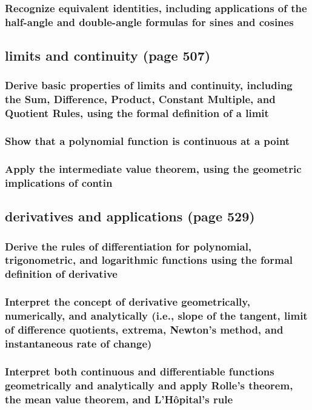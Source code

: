 \documentclass[11pt]{article}
\begin{document}
\subsubsection{Recognize equivalent identities, including applications of the half-angle and double-angle formulas for sines and cosines}
\label{sec:orgeac3892}
\subsection{limits and continuity (page 507)}
\label{sec:org4f4016c}
\subsubsection{Derive basic properties of limits and continuity, including the Sum, Difference, Product, Constant Multiple, and Quotient Rules, using the formal definition of a limit}
\label{sec:orgb6f1019}
\subsubsection{Show that a polynomial function is continuous at a point}
\label{sec:org3ec723d}
\subsubsection{Apply the intermediate value theorem, using the geometric implications of contin}
\label{sec:org4fb7324}
\subsection{derivatives and applications (page 529)}
\label{sec:org29a166e}
\subsubsection{Derive the rules of differentiation for polynomial, trigonometric, and logarithmic functions using the formal definition of derivative}
\label{sec:org6c427fa}
\subsubsection{Interpret the concept of derivative geometrically, numerically, and analytically (i.e., slope of the tangent, limit of difference quotients, extrema, Newton's method, and instantaneous rate of change)}
\label{sec:org08c3d3d}
\subsubsection{Interpret both continuous and differentiable functions geometrically and analytically and apply Rolle's theorem, the mean value theorem, and L'Hôpital's rule}
\label{sec:org1ffb47b}
\end{document}
